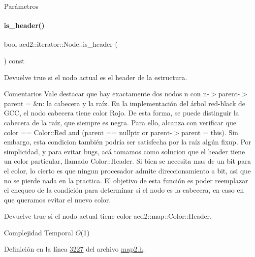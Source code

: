 \begin{DoxyParams}{\-Parámetros}
\paragraph{\texorpdfstring{is\+\_\+header()}{is\_header()}}
{\footnotesize\ttfamily bool aed2\+::iterator\+::\+Node\+::is\+\_\+header (\begin{DoxyParamCaption}{ }\end{DoxyParamCaption}) const\hspace{0.3cm}{\ttfamily [inline]}}



Devuelve true si el nodo actual es el header de la estructura. 

\begin{DoxyRemark}{Comentarios}
Vale destacar que hay exactamente dos nodos n con n-\/$>$parent-\/$>$parent = \&n\+: la cabecera y la raíz. En la implementación del árbol red-\/black de G\+CC, el nodo cabecera tiene color Rojo. De esta forma, se puede distinguir la cabecera de la raíz, que siempre es negra. Para ello, alcanza con verificar que {\ttfamily color == Color\+::\+Red and (parent == nullptr or parent-\/$>$parent = this)}. Sin embargo, esta condicion también podría ser satisfecha por la raíz algún {\ttfamily fixup}. Por simplicidad, y para evitar bugs, acá tomamos como solucion que el header tiene un color particular, llamado Color\+::\+Header. Si bien se necesita mas de un bit para el color, lo cierto es que ningun procesador admite direccionamiento a bit, asi que no se pierde nada en la practica. El objetivo de esta función es poder reemplazar el chequeo de la condición para determinar si el nodo es la cabecera, en caso en que queramos evitar el nuevo color.
\end{DoxyRemark}
\begin{DoxyReturn}{Devuelve}
true si el nodo actual tiene color aed2\+::map\+::\+Color\+::\+Header.
\end{DoxyReturn}

\begin{DoxyDescription}
\item[Complejidad Temporal]$O$(1)
\end{DoxyDescription}

Definición en la línea \hyperlink{map2_8h_source_l03227}{3227} del archivo \hyperlink{map2_8h_source}{map2.\+h}.

\mbox{\label{structaed2_1_1iterator_1_1Node_a968601069822105337814f963d79d635_a968601069822105337814f963d79d635}} 

\end{DoxyParams}

